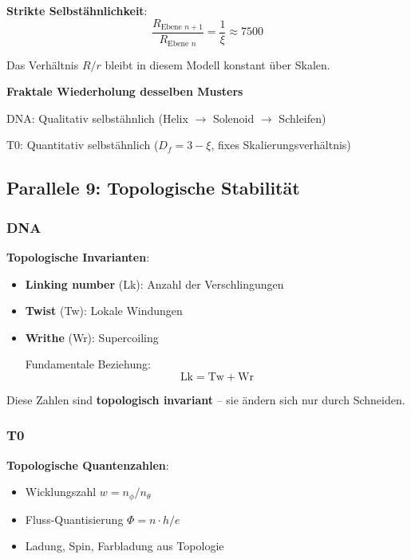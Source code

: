 	\textbf{Strikte Selbstähnlichkeit}:
	\begin{equation}
		\frac{R_{\text{Ebene } n+1}}{R_{\text{Ebene } n}} = \frac{1}{\xi} \approx 7500
	\end{equation}

	Das Verhältnis $R/r$ bleibt in diesem Modell konstant über Skalen.

	\begin{keyresult}
		\textbf{Fraktale Wiederholung desselben Musters}

		DNA: Qualitativ selbstähnlich (Helix $\to$ Solenoid $\to$ Schleifen)

		T0: Quantitativ selbstähnlich ($D_f = 3-\xi$, fixes Skalierungsverhältnis)
	\end{keyresult}

	\subsection{Parallele 9: Topologische Stabilität}

	\subsubsection{DNA}

	\textbf{Topologische Invarianten}:

	\begin{itemize}
		\item \textbf{Linking number} (Lk): Anzahl der Verschlingungen
		\item \textbf{Twist} (Tw): Lokale Windungen
		\item \textbf{Writhe} (Wr): Supercoiling

		Fundamentale Beziehung:
		\begin{equation}
			\text{Lk} = \text{Tw} + \text{Wr}
		\end{equation}
	\end{itemize}

	Diese Zahlen sind \textbf{topologisch invariant} -- sie ändern sich nur durch Schneiden.

	\subsubsection{T0}

	\textbf{Topologische Quantenzahlen}:
	\begin{itemize}
		\item Wicklungszahl $w = n_\phi / n_\theta$
		\item Fluss-Quantisierung $\Phi = n \cdot h/e$
		\item Ladung, Spin, Farbladung aus Topologie
	\end{itemize}

